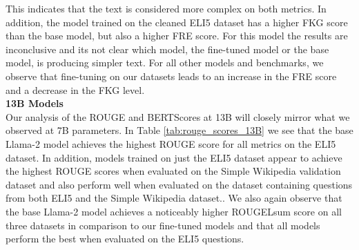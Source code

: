 \documentclass[11pt, oneside]{article}   	%
\begin{document}
This indicates that the text is considered more complex on both metrics.
In addition, the model trained on the cleaned ELI5 dataset has a higher FKG score than the base model, but also a higher FRE score.
For this model the results are inconclusive and its not clear which model, the fine-tuned model or the base model, is producing simpler text.
For all other models and benchmarks, we observe that fine-tuning on our datasets leads to an increase in the FRE score and a decrease in the FKG level.
\\[10pt]
\noindent\textbf{13B Models}
\\[10pt]
Our analysis of the ROUGE and BERTScores at 13B will closely mirror what we observed at 7B parameters.
In Table \ref{tab:rouge_scores_13B} we see that the base Llama-2 model achieves the highest ROUGE score for all metrics on the ELI5 dataset. In addition, models trained on just the ELI5 dataset appear to achieve the highest ROUGE scores when evaluated on the Simple Wikipedia validation dataset and also perform well when evaluated on the dataset containing questions from both ELI5 and the Simple Wikipedia dataset..
We also again observe that the base Llama-2 model achieves a noticeably higher ROUGELsum score on all three datasets in comparison to our fine-tuned models and that all models perform the best when evaluated on the ELI5 questions.
\end{document}
